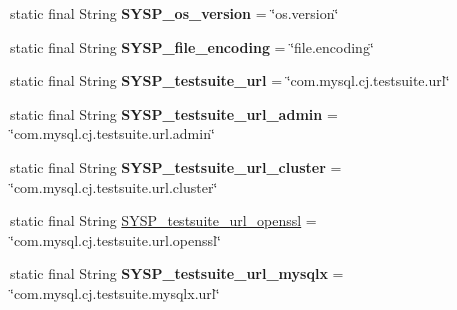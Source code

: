 \begin{DoxyCompactItemize}
static final String {\bfseries S\+Y\+S\+P\+\_\+os\+\_\+version} = \char`\"{}os.\+version\char`\"{}
\item 
\mbox{\label{classcom_1_1mysql_1_1cj_1_1conf_1_1_property_definitions_a66487c1a3fb2e2e4e317c1dd76cfbc41}} 
static final String {\bfseries S\+Y\+S\+P\+\_\+file\+\_\+encoding} = \char`\"{}file.\+encoding\char`\"{}
\item 
\mbox{\label{classcom_1_1mysql_1_1cj_1_1conf_1_1_property_definitions_afb6b7524dc5ef5f820f4638083c07e0e}} 
static final String {\bfseries S\+Y\+S\+P\+\_\+testsuite\+\_\+url} = \char`\"{}com.\+mysql.\+cj.\+testsuite.\+url\char`\"{}
\item 
\mbox{\label{classcom_1_1mysql_1_1cj_1_1conf_1_1_property_definitions_ae149a58f7b216c5aa7431ff6738fc6f5}} 
static final String {\bfseries S\+Y\+S\+P\+\_\+testsuite\+\_\+url\+\_\+admin} = \char`\"{}com.\+mysql.\+cj.\+testsuite.\+url.\+admin\char`\"{}
\item 
\mbox{\label{classcom_1_1mysql_1_1cj_1_1conf_1_1_property_definitions_a323dcb55dd68999da8bc238809002994}} 
static final String {\bfseries S\+Y\+S\+P\+\_\+testsuite\+\_\+url\+\_\+cluster} = \char`\"{}com.\+mysql.\+cj.\+testsuite.\+url.\+cluster\char`\"{}
\item 
static final String \mbox{\hyperlink{classcom_1_1mysql_1_1cj_1_1conf_1_1_property_definitions_a423748df889d74615c27c2d95cdc9644}{S\+Y\+S\+P\+\_\+testsuite\+\_\+url\+\_\+openssl}} = \char`\"{}com.\+mysql.\+cj.\+testsuite.\+url.\+openssl\char`\"{}
\item 
\mbox{\label{classcom_1_1mysql_1_1cj_1_1conf_1_1_property_definitions_a3952b559e0b2ffabf6b1c21eccd179e7}} 
static final String {\bfseries S\+Y\+S\+P\+\_\+testsuite\+\_\+url\+\_\+mysqlx} = \char`\"{}com.\+mysql.\+cj.\+testsuite.\+mysqlx.\+url\char`\"{}
\item 
\mbox{\label{classcom_1_1mysql_1_1cj_1_1conf_1_1_property_definitions_ac9827436f218e4b63f1f17fe18cdeb38}} 

\end{DoxyCompactItemize}
